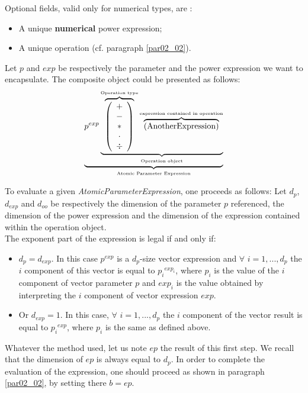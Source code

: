 \documentclass[a4paper,11pt] {ivoa}
\begin{document}
Optional fields, valid only for numerical types, are :
\begin{itemize}
\item A unique {\bf numerical} power expression;
\item A unique operation (cf. paragraph \ref{par02_02}).\\
\end{itemize}
Let $p$ and $exp$ be respectively the parameter and the power expression we want to encapsulate. The
composite object could be presented as follows:
\begin{equation}\label{eq01}
 \underbrace{  p^{exp} \underbrace{  \overbrace{\left( \begin{array}{c} + \\ - \\ \ast  \\ \cdot \\ \div   \end{array} \right) }^{\mbox{\tiny Operation type}}
 \overbrace{    \left( \mbox{AnotherExpression}\right) }^{\mbox{\tiny expression contained in operation}}   }_{\mbox{\tiny Operation object}}}_{\mbox{\tiny Atomic Parameter Expression}}
\end{equation}

To evaluate a given {\it AtomicParameterExpression}, one proceeds as follows: 
Let $d_p$, $d_{exp}$ and $d_{oo}$ be respectively the dimension of the parameter $p$ referenced, the
dimension of the power expression and the dimension of the expression contained within the operation
object.\\
The exponent part of the expression is legal if and only if:
\begin{itemize}
\item $d_p=d_{exp}$. In this case $p^{exp}$ is a $d_p$-size vector expression and $\forall$
$i=1,...,d_p$ the $i$ component of this vector is equal to ${p_i}^{exp_i}$, where $p_i$ is the value
of the $i$ component of vector parameter $p$ and $exp_i$ is the value obtained by interpreting the
$i$ component of vector expression $exp$.
\item Or $d_{exp}=1$. In this case, $\forall$ $i=1,...,d_p$ the $i$ component of the vector result
is equal to ${p_i}^{exp}$, where $p_i$ is the same as defined above.\\
\end{itemize} 

Whatever the method used, let us note $ep$ the result of this first step. We recall that the
dimension of $ep$ is always equal to $d_p$. In order to complete the evaluation of the expression,
one should proceed as shown in paragraph \ref{par02_02}, by setting there $b=ep$.
\end{document}
